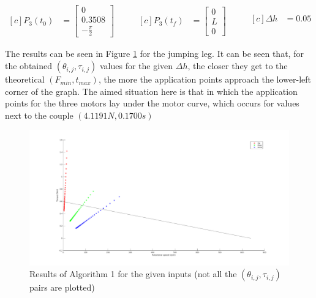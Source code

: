 \begin{equation*}
\label{eq:input_a1}
\begin{aligned}[c]
P_{3}(t_{0}) &= \left[\!
				    \begin{array}{c}
				      0 \\
				      0.3508 \\
				      -\frac{\pi}{2}
				    \end{array}
				  \!\right]
\end{aligned}
\qquad
\begin{aligned}[c]
P_{3}(t_{f}) &= \left[\!
				    \begin{array}{c}
				      0 \\
				      L \\
				      0
				    \end{array}
				  \!\right]
\end{aligned}
\qquad
\begin{aligned}[c]
\Delta h &= 0.05 \\
\end{aligned}
\end{equation*}

The results can be seen in Figure \ref{fig:alg1_results} for the jumping leg.
It can be seen that, for the obtained $(\theta_{i,j}, \tau_{i,j})$ values for the given $\Delta h$, the closer they get to the theoretical $(F_{min}, t_{max})$, the more the application points approach the lower-left corner of the graph.
The aimed situation here is that in which the application points for the three motors lay under the motor curve, which occurs for values next to the couple $(4.1191N, 0.1700s)$

\begin{figure}[h]
	\centering
	\includegraphics[width=1.1\textwidth]{figures/algorithm1.pdf}
	\caption{Results of Algorithm 1 for the given inputs (not all the $(\theta_{i,j}, \tau_{i,j})$ pairs are plotted)}
	\label{fig:alg1_results}
\end{figure}

